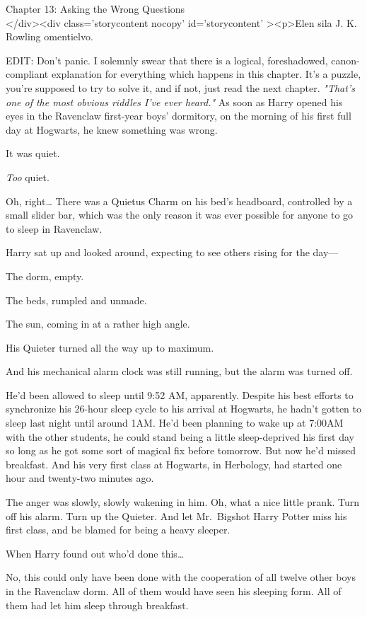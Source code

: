 
Chapter 13: Asking the Wrong Questions\\
</div><div  class='storycontent nocopy' id='storycontent' ><p>Elen sila J. K. 
Rowling omentielvo.

EDIT: Don't panic. I solemnly swear that there is a logical, foreshadowed, 
canon-compliant explanation for everything which happens in this chapter. It's 
a puzzle, you're supposed to try to solve it, and if not, just read the next 
chapter.
\sbreak
\emph{"That's one of the most obvious riddles I've ever heard."}
\sbreak
As soon as Harry opened his eyes in the Ravenclaw first-year boys' dormitory, 
on the morning of his first full day at Hogwarts, he knew something was wrong.

It was quiet.

\emph{Too} quiet.

Oh, right{\ldots} There was a Quietus Charm on his bed's headboard, controlled 
by a small slider bar, which was the only reason it was ever possible for 
anyone to go to sleep in Ravenclaw.

Harry sat up and looked around, expecting to see others rising for the day---

The dorm, empty.

The beds, rumpled and unmade.

The sun, coming in at a rather high angle.

His Quieter turned all the way up to maximum.

And his mechanical alarm clock was still running, but the alarm was turned off.

He'd been allowed to sleep until 9:52 AM, apparently. Despite his best efforts 
to synchronize his 26-hour sleep cycle to his arrival at Hogwarts, he hadn't 
gotten to sleep last night until around 1AM. He'd been planning to wake up at 
7:00AM with the other students, he could stand being a little sleep-deprived 
his first day so long as he got some sort of magical fix before tomorrow. But 
now he'd missed breakfast. And his very first class at Hogwarts, in Herbology, 
had started one hour and twenty-two minutes ago.

The anger was slowly, slowly wakening in him. Oh, what a nice little prank. 
Turn off his alarm. Turn up the Quieter. And let Mr.~Bigshot Harry Potter miss 
his first class, and be blamed for being a heavy sleeper.

When Harry found out who'd done this{\ldots}

No, this could only have been done with the cooperation of all twelve other 
boys in the Ravenclaw dorm. All of them would have seen his sleeping form. All 
of them had let him sleep through breakfast.

